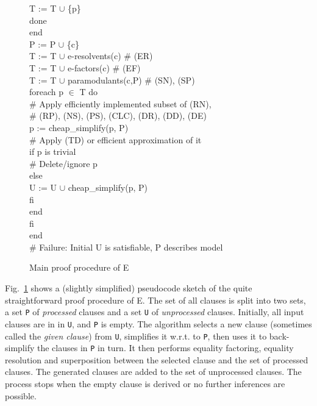 \documentclass{report}
\begin{document}
\begin{figure}[hp]
\begin{center}
\begin{tabbing}
              T := T $\cup$ \{p\}\-\\
            done\-\\
          end\\
          P := P $\cup$ \{c\}\\
          T := T $\cup$ e-resolvents(c)    \# (ER)\\
          T := T $\cup$ e-factors(c)       \# (EF)\\
          T := T $\cup$ paramodulants(c,P) \# (SN), (SP)\\
          foreach p $\in$ T do\+\\
            \# Apply efficiently implemented subset of (RN),\\
            \# (RP), (NS), (PS), (CLC), (DR), (DD), (DE)\\
            p := cheap\_simplify(p, P)\\
            \# Apply (TD) or efficient approximation of it\\
            if p is trivial\+\\
              \# Delete/ignore p\-\\
            else\+\\
               U := U $\cup$ cheap\_simplify(p, P)\-\\
            fi\-\\
          end\-\\
        fi\-\\
      end\\
      \# Failure: Initial U is satisfiable, P describes model
    \end{tabbing}
    \normalfont
    \caption{Main proof procedure of E}
    \label{fig:procedure}
  \end{center}
\end{figure}

Fig.~\ref{fig:procedure} shows a (slightly simplified) pseudocode
sketch of the quite straightforward proof procedure of E. The set of
all clauses is split into two sets, a set \texttt{P} of
\emph{processed} clauses and a set \texttt{U} of \emph{unprocessed}
clauses. Initially, all input clauses are in in \texttt{U}, and
\texttt{P} is empty. The algorithm selects a new clause (sometimes
called the \emph{given clause}) from \texttt{U},
simplifies it w.r.t. to \texttt{P}, then uses it to back-simplify the
clauses in \texttt{P} in turn. It then performs equality factoring,
equality resolution and superposition between the selected clause and
the set of processed clauses. The generated clauses are added to the
set of unprocessed clauses. The process stops when the empty clause is
derived or no further inferences are possible.
\end{document}

